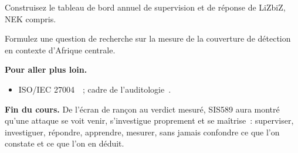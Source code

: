 \begin{boxexo}[title={\ding{45}\quad Exercice~20.9. Tableau de bord \niveauexpert}]
Construisez le tableau de bord annuel de supervision et de réponse de LiZbiZ,
NEK compris.
\end{boxexo}

\begin{boxexo}[title={\ding{45}\quad Exercice~20.10. Question de recherche \niveauexpert}]
Formulez une question de recherche sur la mesure de la couverture de
détection en contexte d'Afrique centrale.
\end{boxexo}

\bigskip

\begin{boxinfo}
\textbf{Pour aller plus loin.}
\begin{itemize}
    \item ISO/IEC 27004~\cite{iso27004}~; cadre de
          l'auditologie~\cite{minka2026auditologie}.
\end{itemize}
\end{boxinfo}

\begin{boxinfo}
\textbf{Fin du cours.} De l'écran de rançon au verdict mesuré, SIS589 aura
montré qu'une attaque se voit venir, s'investigue proprement et se maîtrise~:
superviser, investiguer, répondre, apprendre, mesurer, sans jamais confondre
ce que l'on constate et ce que l'on en déduit.
\end{boxinfo}
